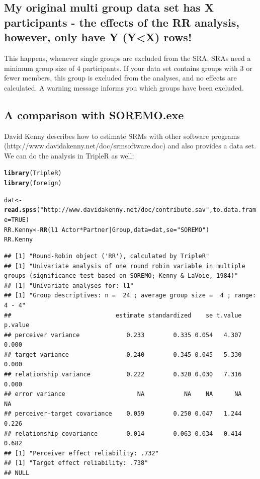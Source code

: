 \documentclass[a4paper]{article}\usepackage[]{graphicx}\usepackage[]{color}
\makeatletter
\newcommand{\hlnum}[1]{\textcolor[rgb]{0.686,0.059,0.569}{#1}}%
\newcommand{\hlstr}[1]{\textcolor[rgb]{0.192,0.494,0.8}{#1}}%
\newcommand{\hlopt}[1]{\textcolor[rgb]{0,0,0}{#1}}%
\newcommand{\hlstd}[1]{\textcolor[rgb]{0.345,0.345,0.345}{#1}}%
\newcommand{\hlkwb}[1]{\textcolor[rgb]{0.69,0.353,0.396}{#1}}%
\newcommand{\hlkwc}[1]{\textcolor[rgb]{0.333,0.667,0.333}{#1}}%
\newcommand{\hlkwd}[1]{\textcolor[rgb]{0.737,0.353,0.396}{\textbf{#1}}}%
\newenvironment{kframe}{%
 \def\at@end@of@kframe{}%
 \ifinner\ifhmode%
  \def\at@end@of@kframe{\end{minipage}}%
  \begin{minipage}{\columnwidth}%
 \fi\fi%
 \def\FrameCommand##1{\hskip\@totalleftmargin \hskip-\fboxsep
 \colorbox{shadecolor}{##1}\hskip-\fboxsep
     \hskip-\linewidth \hskip-\@totalleftmargin \hskip\columnwidth}%
 \MakeFramed {\advance\hsize-\width
   \@totalleftmargin\z@ \linewidth\hsize
   \@setminipage}}%
 {\par\unskip\endMakeFramed%
 \at@end@of@kframe}
\newenvironment{knitrout}{}{} %
\makeatother
\begin{document}
\subsection{My original multi group data set has X participants - the effects of the RR analysis, however, only have Y (Y<X) rows!} %
\label{sub:my_original_multi_group_data_set_has_x_participants_the_effects_of_the_rr_analysis_hiow}
This happens, whenever single groups are excluded from the SRA. SRAs need a minimum group size of 4 participants. If your data set contains groups with 3 or fewer members, this group is excluded from the analyses, and no effects are calculated. A warning message informs you which groups have been excluded.




\subsection{A comparison with SOREMO.exe} %
\label{sub:an_example_from_david_kenny}
David Kenny describes how to estimate SRMs with other software programs \\(http://www.davidakenny.net/doc/srmsoftware.doc) and also provides a data set. We can do the analysis in TripleR as well:

\begin{knitrout}\small
{}\color{fgcolor}\begin{kframe}
\begin{alltt}
\hlkwd{library}\hlstd{(TripleR)}
\hlkwd{library}\hlstd{(foreign)}

\hlstd{dat} \hlkwb{<-} \hlkwd{read.spss}\hlstd{(}\hlstr{"http://www.davidakenny.net/doc/contribute.sav"}\hlstd{,} \hlkwc{to.data.frame} \hlstd{=} \hlnum{TRUE}\hlstd{)}
\hlstd{RR.Kenny} \hlkwb{<-} \hlkwd{RR}\hlstd{(l1} \hlopt{~} \hlstd{Actor} \hlopt{*} \hlstd{Partner} \hlopt{|} \hlstd{Group,} \hlkwc{data} \hlstd{= dat,} \hlkwc{se} \hlstd{=} \hlstr{"SOREMO"}\hlstd{)}
\hlstd{RR.Kenny}
\end{alltt}
\begin{verbatim}
## [1] "Round-Robin object ('RR'), calculated by TripleR"
## [1] "Univariate analysis of one round robin variable in multiple groups (significance test based on SOREMO; Kenny & LaVoie, 1984)"
## [1] "Univariate analyses for: l1"
## [1] "Group descriptives: n =  24 ; average group size =  4 ; range:  4 - 4"
##                             estimate standardized    se t.value p.value
## perceiver variance             0.233        0.335 0.054   4.307   0.000
## target variance                0.240        0.345 0.045   5.330   0.000
## relationship variance          0.222        0.320 0.030   7.316   0.000
## error variance                    NA           NA    NA      NA      NA
## perceiver-target covariance    0.059        0.250 0.047   1.244   0.226
## relationship covariance        0.014        0.063 0.034   0.414   0.682
## [1] "Perceiver effect reliability: .732"
## [1] "Target effect reliability: .738"
## NULL
\end{verbatim}
\end{kframe}
\end{knitrout}
\end{document}
